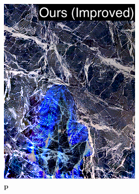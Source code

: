 \begin{figure}[]
\begin{subfigure}{\textwidth}
        \begin{subfigure}{0.24\textwidth}
            \centering
            \includegraphics[width=\textwidth]{images/04-experiment02/human/marble/improved_im_label.jpg}
            \caption*{\(\bm{p}\)}
        \end{subfigure}
        \hfill
        \begin{subfigure}{0.24\textwidth}
            \centering

\end{subfigure}
\end{subfigure}
\end{figure}
